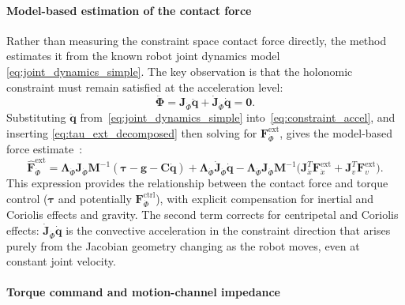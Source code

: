 \documentclass[
	german,%
	accentcolor=9c,%
	ruledheaders=section,%
	class=report,%
	thesis={type=bachelor},%
	fontsize=11pt,%
	parskip=half-,%
	custommargins=true,%
	marginpar=false,%
]{tudapub}
\begin{document}
\paragraph{Model-based estimation of the contact force}

Rather than measuring the constraint space contact force directly, the method estimates it
from the known robot joint dynamics model \eqref{eq:joint_dynamics_simple}.
The key observation is that the holonomic constraint must remain satisfied
at the acceleration level:
\begin{equation}
    \ddot{\boldsymbol{\Phi}}
    = \mathbf{J}_{\dot{\Phi}}\ddot{\mathbf{q}}
      + \dot{\mathbf{J}}_{\dot{\Phi}}\dot{\mathbf{q}}
    = \mathbf{0}.
    \label{eq:constraint_accel}
\end{equation}
Substituting $\ddot{\mathbf{q}}$ from~\eqref{eq:joint_dynamics_simple} 
into~\eqref{eq:constraint_accel}, and inserting \eqref{eq:tau_ext_decomposed} then
solving for $\mathbf{F}^{\text{ext}}_{\dot{\Phi}}$, gives the model-based
force estimate~\cite[Eq.~14]{iskandar2023}:
\begin{equation}
    \hat{\mathbf{F}}^{\text{ext}}_{\dot{\Phi}}
    =
    \boldsymbol{\Lambda}_{\dot{\Phi}}
    \mathbf{J}_{\dot{\Phi}}\mathbf{M}^{-1}
    (\boldsymbol{\tau} - \mathbf{g} - \mathbf{C}\dot{\mathbf{q}})
    +
    \boldsymbol{\Lambda}_{\dot{\Phi}}
    \dot{\mathbf{J}}_{\dot{\Phi}}\dot{\mathbf{q}}
    -
    \boldsymbol{\Lambda}_{\dot{\Phi}}
    \mathbf{J}_{\dot{\Phi}}\mathbf{M}^{-1}
    \bigl(
        \mathbf{J}_{\dot{x}}^{T}\mathbf{F}^{\text{ext}}_{\dot{x}}
        + \mathbf{J}_{v}^{T}\mathbf{F}^{\text{ext}}_{v}
    \bigr).
    \label{eq:F_hat_ext}
\end{equation}
This expression provides the relationship between the contact force and torque control ($\boldsymbol{\tau}$ and potentially $\mathbf{F}^{\text{ctrl}}_{\dot{\Phi}}$), with explicit compensation for inertial and Coriolis effects and gravity. 
The second term corrects for centripetal and Coriolis effects:
$\dot{\mathbf{J}}_{\dot{\Phi}}\dot{\mathbf{q}}$ is the convective acceleration
in the constraint direction that arises purely from the Jacobian geometry
changing as the robot moves, even at constant joint velocity.

\paragraph{Torque command and motion-channel impedance}
\end{document}
